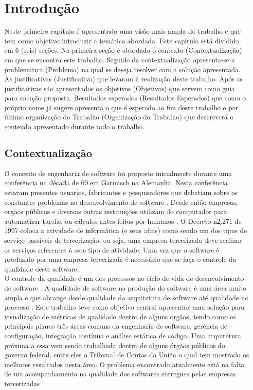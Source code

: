 \chapter[Introdução]{Introdução}
	Neste primeiro capítulo é apresentado uma visão mais ampla do trabalho e que tem como objetivo introduzir a temática abordada. Este capítulo está dividido em 6 (seis) seções. Na primeira seção é abordado o contexto (Contextualização) em que se encontra este trabalho. Seguido da contextualização apresenta-se a problematica (Problema) na qual se deseja resolver com a solução apresentada. As justificativas (Justificativa) que levaram à realização deste trabalho. Após as justificativas são apresentados os objetivos (Objetivos) que servem como guia para solução proposta. Resultados esperados (Resultados Esperados) que como o próprio nome já sugere apresenta o que é esperado ao  fim deste trabalho e por último organização do Trabalho (Organização do Trabalho) que descreverá o conteudo apresentado durante todo o trabalho.


\section{Contextualização}
	O conceito de engenharia de software foi proposto inicialmente durante uma conferência na década de 60 em Garmisch na Alemanha. Nesta conferência estavam presentes usuarios, fabricantes e pesquisadores que debatiam sobre os constantes problemas no desenvolvimento de software \cite{Paduelli}. Desde então empresas, orgãos públicos e diversas outras instituições utilizam do computador para automatizar tarefas ou cálculos antes feitos por humanos \cite{fonseca2007historia}. O Decreto n\c 2.271 de 1997 \cite{decreto_2271} coloca a atividade de informática (e seus afins) como sendo um dos tipos de serviço passíveis de tercerização, ou seja, uma empresa tercerizada deve realizar os serviços referentes à este tipo de atividade. Uma vez que o software é produzido por uma empresa tercerizada é necessário que se faça o controle da qualidade deste software.
\\O controle da qualidade é um dos processos no ciclo de vida de desenvolvimento de software \cite{machado_metricas_2004}. A qualidade de software na produção do software é uma área muito ampla e que abrange desde qualidade da arquitetura de software até qualidade no processo . Este trabalho teve como objetivo central apresentar uma solução para visualização de métricas de qualidade dentro de alguns orgãos, tendo como os principais pilares três áreas comuns da engenharia de software, gerência de configuração, integração contínua e análise estática de código. Uma arquitetura próxima a essa vem sendo trabalhada dentro de alguns órgãos públicos do governo federal, entre eles o Tribunal de Contas da União o qual tem mostrado os melhores resultados nesta área. O problema encontrado atualmente está na falta de um acompanhamento na qualidade dos softwares entregues pelas empresas tercerizadas 	


